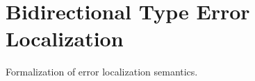 \documentclass{article}
\begin{document}
\renewcommand{\thesection}{\Alph{section}}
\section{Bidirectional Type Error Localization}
Formalization of error localization semantics.
\end{document}
